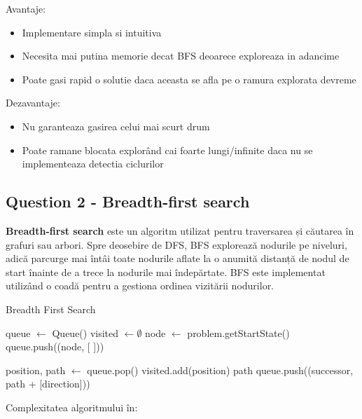 \par Avantaje:
\begin{itemize}
	\item Implementare simpla si intuitiva
	\item Necesita mai putina memorie decat BFS deoarece exploreaza in adancime
	\item Poate gasi rapid o solutie daca aceasta se afla pe o ramura explorata devreme
\end{itemize}

\par Dezavantaje:
\begin{itemize}
	\item Nu garanteaza gasirea celui mai scurt drum
	\item Poate ramane blocata explorând cai foarte lungi/infinite daca nu se implementeaza detectia ciclurilor
\end{itemize}

\pagebreak

\subsection{Question 2 - Breadth-first search}
\par \textbf{Breadth-first search} este un algoritm utilizat pentru traversarea și căutarea în grafuri sau arbori. Spre deosebire de DFS, BFS explorează nodurile pe niveluri, adică parcurge mai întâi toate nodurile aflate la o anumită distanță de nodul de start înainte de a trece la nodurile mai îndepărtate. BFS este implementat utilizând o coadă pentru a gestiona ordinea vizitării nodurilor.

\begin{algorithm}
\caption{Breadth First Search}
\begin{algorithmic}[1]
    \State queue $\gets$ Queue()
    \State visited $\gets \emptyset$
    \State node $\gets$ problem.getStartState()
    \State queue.push((node, [ ]))
    
        \State position, path $\gets$ queue.pop()
            \State visited.add(position)
                \Return path
            \EndIf
                    \State queue.push((successor, path + [direction]))
                \EndIf
            \EndFor
        \EndIf
    \EndWhile \\
    \Return [ ]
\EndFunction
\end{algorithmic}
\end{algorithm}
\par Complexitatea algoritmului în:

